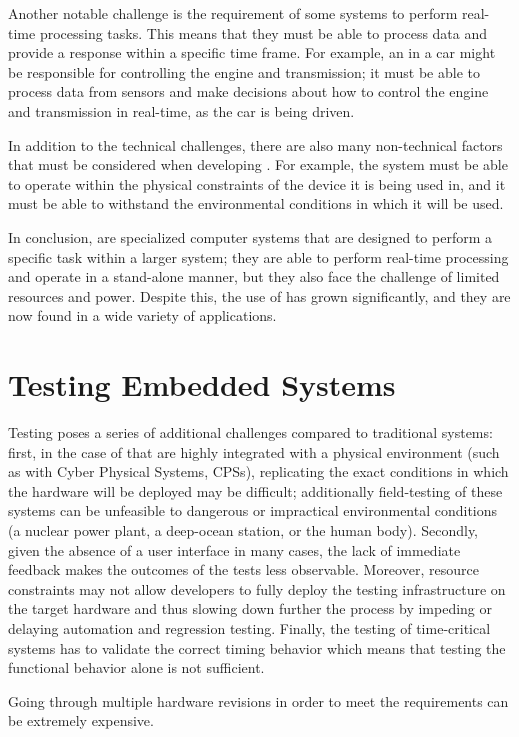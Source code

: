 Another notable challenge is the requirement of some systems to perform real-time processing tasks. This means that they must be able to process data and provide a response within a specific time frame. For example, an \es in a car might be responsible for controlling the engine and transmission; it must be able to process data from sensors and make decisions about how to control the engine and transmission in real-time, as the car is being driven.

In addition to the technical challenges, there are also many non-technical factors that must be considered when developing \ess. For example, the system must be able to operate within the physical constraints of the device it is being used in, and it must be able to withstand the environmental conditions in which it will be used.

In conclusion, \ess are specialized computer systems that are designed to perform a specific task within a larger system; they are able to perform real-time processing and operate in a stand-alone manner, but they also face the challenge of limited resources and power. Despite this, the use of \ess has grown significantly, and they are now found in a wide variety of applications.


\section{Testing Embedded Systems}
Testing \ess poses a series of additional challenges compared to traditional systems: first, in the case of \ess that are highly integrated with a physical environment (such as with Cyber Physical Systems, CPSs), replicating the exact conditions in which the hardware will be deployed may be difficult; additionally field-testing of these systems can be unfeasible to dangerous or impractical environmental conditions (\eg a nuclear power plant, a deep-ocean station, or the human body). Secondly, given the absence of a user interface in many cases, the lack of immediate feedback makes the outcomes of the tests less observable. Moreover, resource constraints may not allow developers to fully deploy the testing infrastructure on the target hardware and thus slowing down further the process by impeding or delaying automation and regression testing.
Finally, the testing of time-critical systems has to validate the correct timing behavior which means that testing the functional behavior alone is not sufficient.


Going through multiple hardware revisions in order to meet the requirements can be extremely expensive.

